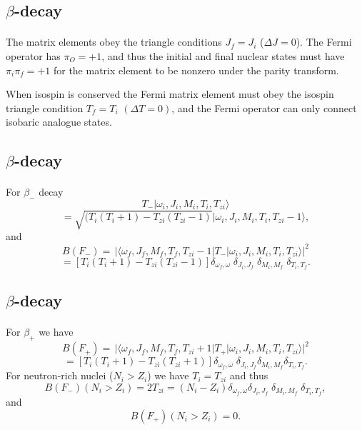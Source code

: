 \documentclass[%
oneside,                 %
final,                   %
10pt]{article}
\begin{document}
\subsection{$\beta$-decay}

\paragraph{}
The matrix elements obey the triangle
conditions $J_{f}=J_{i}$ ($\Delta J=0$). The Fermi operator has
$\pi _{O}=+1$, and thus the
initial and final nuclear states must have $\pi _{i}\pi _{f}=+1$ for
the matrix element to be
nonzero under the parity transform.

When isospin is conserved
the Fermi matrix element must obey the isospin triangle condition
$T_{f}=T_{i}$ $(\Delta T=0)$, and the Fermi operator can only connect
isobaric analogue states.



\subsection{$\beta$-decay}

\paragraph{}
For $\beta_{-}$ decay
\[
T_{-}\vert \omega _{i},J_{i},M_{i},T_{i},T_{zi}\rangle
\]
\[
= \sqrt{(T_{i}(T_{i}+1)-T_{zi}(T_{zi}-1)}\vert \omega _{i},J_{i},M_{i},T_{i},T_{zi}-1\rangle,      
\]
and
\[
B(F_{-}) =\, \vert \langle \omega _{f},J_{f},M_{f},T_{f},T_{zi}-1\vert T_{-}\vert \omega 
_{i},J_{i},M_{i},T_{i},T_{zi}\rangle\vert ^{2}
\]
\[
= [T_{i}(T_{i}+1)-T_{zi}(T_{zi}-1)]
\delta _{\omega _{f},\omega }\;\delta _{J_{i},J_{f}}\;\delta _{M_{i},M_{f}}\;\delta _{T_{i},T_{f}}. 
\]



\subsection{$\beta$-decay}

\paragraph{}
For $\beta_{ + }$ we have
\[
B(F_{+}) =\, \vert \langle \omega _{f},J_{f},M_{f},T_{f},T_{zi}+1\vert T_{+}\vert \omega 
_{i},J_{i},M_{i},T_{i},T_{zi}\rangle\vert ^{2}
\]
\[
= [T_{i}(T_{i}+1)-T_{zi}(T_{zi}+1)]
\delta _{\omega _{f},\omega }\;\delta _{J_{i},J_{f}}\delta _{M_{i},M_{f}}\delta _{T_{i},T_{f}}. 
\]
For neutron-rich nuclei ($N_{i}> Z_{i}$) we have $T_{i}=T_{zi}$ and thus
\[
B(F_{-})(N_{i}> Z_{i}) = 2T_{zi} = (N_{i}-Z_{i})\delta _{\omega _{f},\omega }\delta _{J_{i},J_{f}}\;\delta _{M_{i},M_{f}}\;\delta _{T_{i},T_{f}}, 
\]
and
\[
B(F_{+})(N_{i}> Z_{i}) = 0. 
\]
\end{document}
